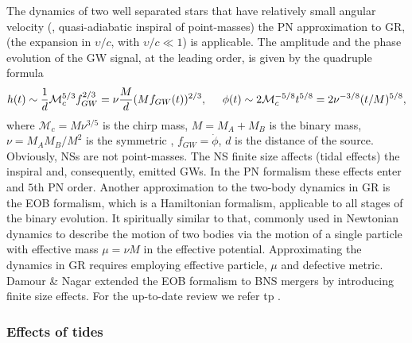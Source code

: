 The dynamics of two well separated stars that have relatively small angular velocity 
(\ie, quasi-adiabatic inspiral of point-masses) the \ac{PN} approximation to \ac{GR}, 
(the expansion in $\upsilon/c$, with $\upsilon/c\ll 1$) is applicable.
%
The amplitude and the phase evolution of the \ac{GW} signal, at the leading order, 
is given by the quadruple formula 
%
\begin{equation}
\label{eq:intro:gw_wave}
h(t) \sim \frac{1}{d}\mathcal{M}_c^{5/3} f_{GW}^{2/3} = \nu\frac{M}{d}(Mf_{GW}(t))^{2/3}, \hspace{5mm} \phi(t) \sim 2\mathcal{M}_c^{-5/8}t^{5/8} = 2\nu^{-3/8}(t/M)^{5/8},
\end{equation}
%
where $\mathcal{M}_c = M\nu^{3/5}$ is the chirp mass, $M = M_A + M_B$ is the binary mass, 
$\nu = M_A M_B/M^2$ is the symmetric \mr{}, $f_{GW} = \dot{\phi}$, $d$ is the distance of the source.
%
Obviously, \acp{NS} are not point-masses. The \ac{NS} finite size affects (tidal effects) the 
inspiral and, consequently, emitted \acp{GW}. In the \ac{PN} formalism these effects enter 
and $5$th \ac{PN} order.
%
%
Another approximation to the two-body dynamics in \ac{GR} is the \ac{EOB} formalism,
which is a Hamiltonian formalism, applicable to all stages of the binary evolution.
It spiritually similar to that, commonly used in Newtonian dynamics to 
describe the motion of two bodies via the motion of a single particle with effective mass 
$\mu=\nu M$ in the effective potential. Approximating the dynamics in \ac{GR} requires 
employing effective particle, $\mu$ and defective metric. 
%
Damour \& Nagar \cite{29} extended the \ac{EOB} formalism to \ac{BNS} mergers by 
introducing finite size effects. For the up-to-date review we refer tp \cite{30}.


\subsubsection{Effects of tides}

